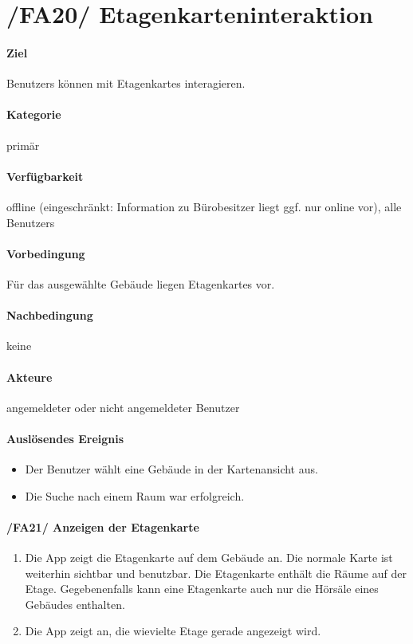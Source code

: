 \section[Etagenkarteninteraktion]{/FA20/ Etagenkarteninteraktion}
\paragraph{Ziel}
\Glspl{Benutzer} können mit \Glspl{Etagenkarte} interagieren.
\paragraph{Kategorie}
primär
\paragraph{Verfügbarkeit}
\gls{offline} (eingeschränkt: Information zu Bürobesitzer liegt ggf. nur online vor), alle \Glspl{Benutzer}
\paragraph{Vorbedingung}
Für das ausgewählte Gebäude liegen \Glspl{Etagenkarte} vor.
\paragraph{Nachbedingung}
keine
\paragraph{Akteure}
angemeldeter oder nicht angemeldeter \Gls{Benutzer}
\paragraph{Auslösendes Ereignis}
\begin{itemize}
    \item Der \Gls{Benutzer} wählt eine Gebäude in der \Gls{Kartenansicht} aus.
    \item Die Suche nach einem Raum war erfolgreich.
\end{itemize}
 
\paragraph{/FA21/ Anzeigen der Etagenkarte}
\label{/FA21/}
\begin{enumerate}
    \item Die App zeigt die \Gls{Etagenkarte} auf dem Gebäude an. Die normale \Gls{Karte} ist weiterhin sichtbar und benutzbar. Die \Gls{Etagenkarte} enthält die Räume auf der Etage. Gegebenenfalls kann eine \Gls{Etagenkarte} auch nur die Hörsäle eines Gebäudes enthalten.
    \item Die App zeigt an, die wievielte Etage gerade angezeigt wird.
\end{enumerate}

